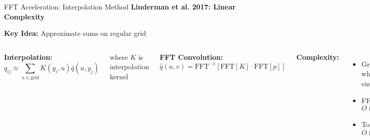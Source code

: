 
\begin{frame}{FFT Acceleration: Interpolation Method}
\textbf{Linderman et al. 2017: Linear Complexity}

\textbf{Key Idea:} Approximate sums on regular grid

\begin{columns}
\textbf{Interpolation:}
$$q_{ij} \approx \sum_{u \in \text{grid}} K(y_i, u) \hat{q}(u, y_j)$$

where $K$ is interpolation kernel

\textbf{FFT Convolution:}
$$\hat{q}(u, v) = \text{FFT}^{-1}[\text{FFT}[K] \cdot \text{FFT}[p]]$$

\textbf{Complexity:}
\begin{itemize}
\item Grid: $O(m^p)$ where $m$ = grid size
\item FFT: $O(m^p \log m)$
\item Total: $O(n + m^p \log m)$
\end{itemize}

\begin{center}
\end{center}
\end{columns}

\end{frame}

